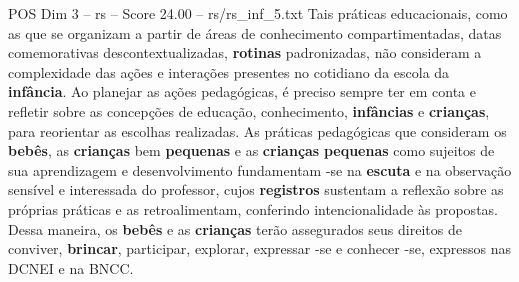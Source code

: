 \begin{textsample}{POS Dim 3 – rs – Score 24.00 – rs/rs\_inf\_5.txt}
Tais práticas educacionais, como as que se organizam a partir de áreas de conhecimento compartimentadas, datas comemorativas descontextualizadas, \textbf{rotinas} padronizadas, não consideram a complexidade das ações e interações presentes no cotidiano da escola da \textbf{infância}.
Ao planejar as ações pedagógicas, é preciso sempre ter em conta e refletir sobre as concepções de educação, conhecimento, \textbf{infâncias} e \textbf{crianças}, para reorientar as escolhas realizadas.
As práticas pedagógicas que consideram os \textbf{bebês}, as \textbf{crianças} bem \textbf{pequenas} e as \textbf{crianças} \textbf{pequenas} como sujeitos de sua aprendizagem e desenvolvimento fundamentam -se na \textbf{escuta} e na observação sensível e interessada do professor, cujos \textbf{registros} sustentam a reflexão sobre as próprias práticas e as retroalimentam, conferindo intencionalidade às propostas.
Dessa maneira, os \textbf{bebês} e as \textbf{crianças} terão assegurados seus direitos de conviver, \textbf{brincar}, participar, explorar, expressar -se e conhecer -se, expressos nas DCNEI e na BNCC.

\end{textsample}
